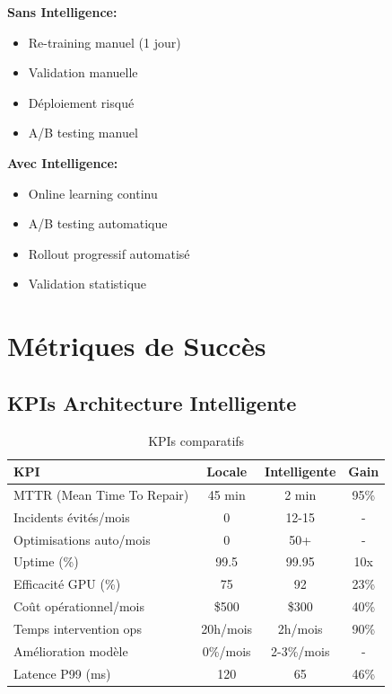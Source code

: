 \documentclass[12pt,a4paper]{article}
\begin{document}
\textbf{Sans Intelligence:}
\begin{itemize}
    \item Re-training manuel (1 jour)
    \item Validation manuelle
    \item Déploiement risqué
    \item A/B testing manuel
\end{itemize}

\textbf{Avec Intelligence:}
\begin{itemize}
    \item Online learning continu
    \item A/B testing automatique
    \item Rollout progressif automatisé
    \item Validation statistique
\end{itemize}

\section{Métriques de Succès}

\subsection{KPIs Architecture Intelligente}

\begin{table}[H]
\centering
\begin{tabular}{|l|c|c|c|}
\hline
\textbf{KPI} & \textbf{Locale} & \textbf{Intelligente} & \textbf{Gain} \\
\hline
MTTR (Mean Time To Repair) & 45 min & 2 min & 95\% \\
\hline
Incidents évités/mois & 0 & 12-15 & - \\
\hline
Optimisations auto/mois & 0 & 50+ & - \\
\hline
Uptime (\%) & 99.5 & 99.95 & 10x \\
\hline
Efficacité GPU (\%) & 75 & 92 & 23\% \\
\hline
Coût opérationnel/mois & \$500 & \$300 & 40\% \\
\hline
Temps intervention ops & 20h/mois & 2h/mois & 90\% \\
\hline
Amélioration modèle & 0\%/mois & 2-3\%/mois & - \\
\hline
Latence P99 (ms) & 120 & 65 & 46\% \\
\hline
\end{tabular}
\caption{KPIs comparatifs}
\end{table}
\end{document}
